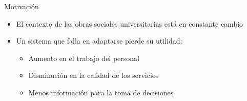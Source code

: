 \documentclass[10pt]{beamer}
\begin{document}
\begin{frame}{Motivación}
    \begin{itemize}
        \item El contexto de las obras sociales universitarias está en constante cambio
        \item Un sistema que falla en adaptarse pierde su utilidad:
        \begin{itemize}
            \item Aumento en el trabajo del personal
            \item Disminución en la calidad de los servicios
            \item Menos información para la toma de decisiones
        \end{itemize}
    \end{itemize}
\end{frame}
\begin{comment}
La motivación de este trabajo parte, principalmente, de dos observaciones
- El contexto de las obras sociales universitarias está en constante cambio
- Un sistema que falla en adaptarse pierde su utilidad, en la medida en que las funcionalidades brindadas por el mismo no son adaptadas para acomodar los cambios en el contexto. Esta perdida de utilidad suele manifestarse en forma de
    - Aumento en el trabajo del personal: el cual tiene que responder para tener en cuenta los cambios que el sistema no tuvo. Este trabajo manual además reemplaza parte del trabajo que estaba previamente automatizado.
    - Disminución en la calidad de servicio: El aumento en la porción del trabajo manual se traduce en un aumento de los tiempos necesarios para llevar a cabo trámites y tareas dentro de la obra social, lo que resulta en la pérdida de la calidad percibida por los afiliados.
    - Menos información para la toma de decisiones: La disminución en la porción del trabajo automatizado conlleva una disminución correspondiente en la capacidad del sistema para recolectar información, con la cual respaldar la toma de decisiones.
\end{comment}
\end{document}
